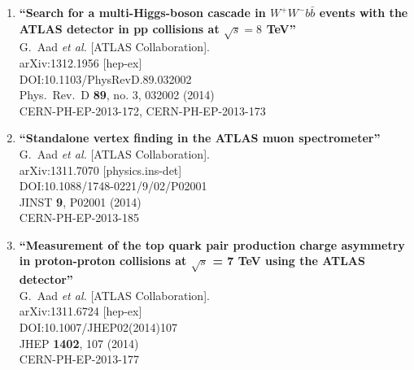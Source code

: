 \documentclass{article}
\begin{document}
\begin{enumerate}
{\bf ``Measurement of dijet cross sections in $pp$ collisions at 7 TeV centre-of-mass energy using the ATLAS detector''}
  \\{}G.~Aad {\it et al.} [ATLAS Collaboration].
  \\{}arXiv:1312.3524 [hep-ex]
  \\{}DOI:10.1007/JHEP05(2014)059
  \\{}JHEP {\bf 1405}, 059 (2014)
  \\{}CERN-PH-EP-2013-192
\item%
{\bf ``Search for a multi-Higgs-boson cascade in $W^+W^−b\bar{b}$ events with the ATLAS detector in pp collisions at $\sqrt{s} = 8$  TeV''}
  \\{}G.~Aad {\it et al.} [ATLAS Collaboration].
  \\{}arXiv:1312.1956 [hep-ex]
  \\{}DOI:10.1103/PhysRevD.89.032002
  \\{}Phys.\ Rev.\ D {\bf 89}, no. 3, 032002 (2014)
  \\{}CERN-PH-EP-2013-172, CERN-PH-EP-2013-173
\item%
{\bf ``Standalone vertex finding in the ATLAS muon spectrometer''}
  \\{}G.~Aad {\it et al.} [ATLAS Collaboration].
  \\{}arXiv:1311.7070 [physics.ins-det]
  \\{}DOI:10.1088/1748-0221/9/02/P02001
  \\{}JINST {\bf 9}, P02001 (2014)
  \\{}CERN-PH-EP-2013-185
\item%
{\bf ``Measurement of the top quark pair production charge asymmetry in proton-proton collisions at $\sqrt{s}$ = 7 TeV using the ATLAS detector''}
  \\{}G.~Aad {\it et al.} [ATLAS Collaboration].
  \\{}arXiv:1311.6724 [hep-ex]
  \\{}DOI:10.1007/JHEP02(2014)107
  \\{}JHEP {\bf 1402}, 107 (2014)
  \\{}CERN-PH-EP-2013-177

\end{enumerate}
\end{document}
